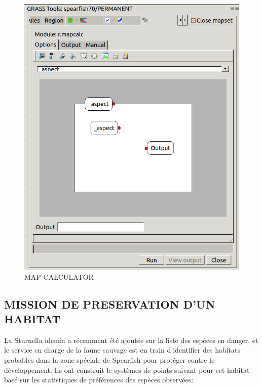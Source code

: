 \begin{figure}[htbp]
   \centering
   \includegraphics[scale=0.2]{grass016.png}
   \caption{MAP CALCULATOR}
   \label{fig:grass016}
\end{figure}

\subsection{MISSION DE PRESERVATION D'UN HABITAT}
La Sturnella idemia a r\'ecemment \'et\'e ajout\'ee sur la liste des esp\`eces en danger, et le service en charge de la faune sauvage est en train d'identifier des habitats probables dans la zone sp\'eciale de Spearfish pour prot\'eger contre le d\'eveloppement. Ils ont construit le syst\`emes de points suivant pour cet habitat bas\'e sur les statistiques de pr\'ef\'erences des esp\`eces observ\'ees:

